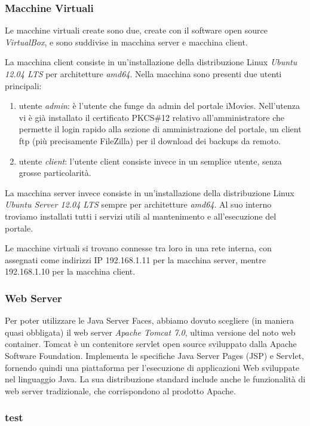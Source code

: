 \documentclass{article}
\begin{document}
\subsubsection*{Macchine Virtuali}
Le macchine virtuali create sono due, create con il software open source \emph{VirtualBox}, e sono suddivise in macchina server e macchina client.
\par La macchina client consiste in un'installazione della distribuzione Linux \emph{Ubuntu 12.04 LTS} per architetture \emph{amd64}. Nella macchina sono presenti due utenti principali:
\begin{enumerate}
\item utente \emph{admin}: è l'utente che funge da admin del portale iMovies. Nell'utenza vi è già installato il certificato PKCS\#12 relativo all'amministratore che permette il login rapido alla sezione di amministrazione del portale, un client ftp (più precisamente FileZilla) per il download dei backups da remoto.
\item utente \emph{client}: l'utente client consiste invece in un semplice utente, senza grosse particolarità.
\end{enumerate} 
\par La macchina server invece consiste in un'installazione della distribuzione Linux \emph{Ubuntu Server 12.04 LTS} sempre per architetture \emph{amd64}.
Al suo interno troviamo installati tutti i servizi utili al mantenimento e all'esecuzione del portale.
\par Le macchine virtuali si trovano connesse tra loro in una rete interna, con assegnati come indirizzi IP 192.168.1.11 per la macchina server, mentre 192.168.1.10 per la macchina client.
\subsubsection*{Web Server}
Per poter utilizzare le Java Server Faces, abbiamo dovuto scegliere (in maniera quasi obbligata) il web server \emph{Apache Tomcat 7.0}, ultima versione del noto web container.
Tomcat è un contenitore servlet open source sviluppato dalla Apache Software Foundation. Implementa le specifiche Java Server Pages (JSP) e Servlet, fornendo quindi una piattaforma per l'esecuzione di applicazioni Web sviluppate nel linguaggio Java. La sua distribuzione standard include anche le funzionalità di web server tradizionale, che corrispondono al prodotto Apache.
\subsubsection*{test}
\end{document}

